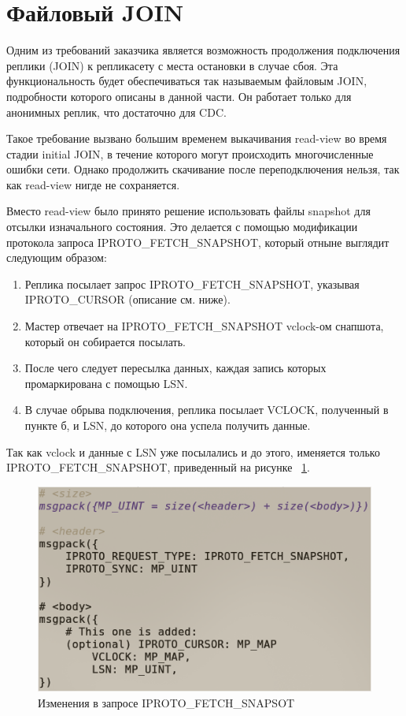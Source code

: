 \section{Файловый JOIN}

Одним из требований заказчика является возможность продолжения подключения реплики (JOIN) к репликасету с места остановки в случае сбоя. Эта функциональность будет обеспечиваться так называемым файловым JOIN, подробности которого описаны в данной части. Он работает только для анонимных реплик, что достаточно для CDC.

Такое требование вызвано большим временем выкачивания read-view во время стадии initial JOIN, в течение которого могут происходить многочисленные ошибки сети. Однако продолжить скачивание после переподключения нельзя, так как read-view нигде не сохраняется.

Вместо read-view было принято решение использовать файлы snapshot для отсылки изначального состояния. Это делается с помощью модификации протокола запроса IPROTO\_FETCH\_SNAPSHOT, который отныне выглядит следующим образом:

\begin{enumerate}
    \item Реплика посылает запрос IPROTO\_FETCH\_SNAPSHOT, указывая IPROTO\_CURSOR (описание см. ниже).
    \item Мастер отвечает на IPROTO\_FETCH\_SNAPSHOT vclock-ом снапшота, который он собирается посылать.
    \item После чего следует пересылка данных, каждая запись которых промаркирована с помощью LSN.
    \item В случае обрыва подключения, реплика посылает VCLOCK, полученный в пункте б, и LSN, до которого она успела получить данные.
\end{enumerate}

Так как vclock и данные с LSN уже посылались и до этого, именяется только IPROTO\_FETCH\_SNAPSHOT, приведенный на рисунке ~\ref{fig:fig04}.

\begin{figure}
  \centering
  \includegraphics[scale=2.00]{inc/listing.png}
  \caption{Изменения в запросе IPROTO\_FETCH\_SNAPSOT}
  \label{fig:fig04}
\end{figure}

